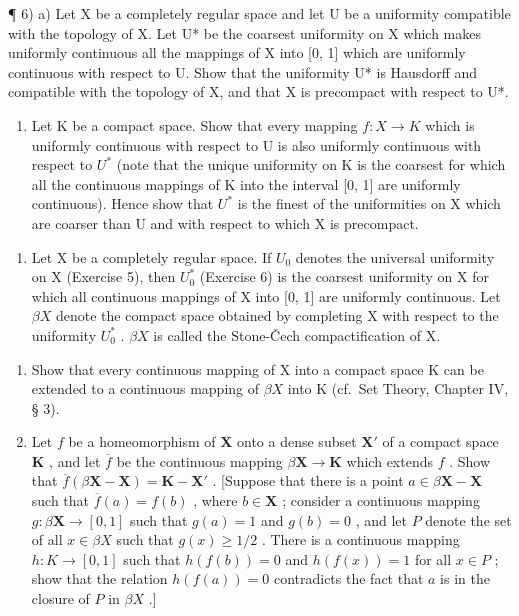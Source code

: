 ¶ 6) a) Let X be a completely regular space and let U be a uniformity compatible with the topology of X. Let U* be the coarsest uniformity on X which makes uniformly continuous all the mappings of X into {[}0, 1{]} which are uniformly continuous with respect to U. Show that the uniformity U* is Hausdorff and compatible with the topology of X, and that X is precompact with respect to U*.

\begin{enumerate}
\def\labelenumi{\alph{enumi})}
\setcounter{enumi}{1}
\tightlist
\item
  Let K be a compact space. Show that every mapping \(f: X \to K\) which is uniformly continuous with respect to U is also uniformly continuous with respect to \(U^{*}\) (note that the unique uniformity on K is the coarsest for which all the continuous mappings of K into the interval {[}0, 1{]} are uniformly continuous). Hence show that \(U^{*}\) is the finest of the uniformities on X which are coarser than U and with respect to which X is precompact.
\end{enumerate}

\begin{enumerate}
\def\labelenumi{\arabic{enumi})}
\setcounter{enumi}{6}
\tightlist
\item
  Let X be a completely regular space. If \(U_{0}\) denotes the universal uniformity on X (Exercise 5), then \(U_{0}^{*}\) (Exercise 6) is the coarsest uniformity on X for which all continuous mappings of X into {[}0, 1{]} are uniformly continuous. Let \(\beta X\) denote the compact space obtained by completing X with respect to the uniformity \(U_{0}^{*}\) . \(\beta X\) is called the Stone-Čech compactification of X.
\end{enumerate}

\begin{enumerate}
\def\labelenumi{\alph{enumi})}
\item
  Show that every continuous mapping of X into a compact space K can be extended to a continuous mapping of \(\beta X\) into K (cf.~Set Theory, Chapter IV, § 3).
\item
  Let \(f\) be a homeomorphism of \(\mathbf{X}\) onto a dense subset \(\mathbf{X}'\) of a compact space \(\mathbf{K}\) , and let \(\overline{f}\) be the continuous mapping \(\beta \mathbf{X} \to \mathbf{K}\) which extends \(f\) . Show that \(\overline{f}(\beta \mathbf{X} - \mathbf{X}) = \mathbf{K} - \mathbf{X}'\) . {[}Suppose that there is a point \(a \in \beta \mathbf{X} - \mathbf{X}\) such that \(\overline{f}(a) = f(b)\) , where \(b \in \mathbf{X}\) ; consider a continuous mapping \(g: \beta \mathbf{X} \to [0, 1]\) such that \(g(a) = 1\) and \(g(b) = 0\) , and let \(P\) denote the set of all \(x \in \beta X\) such that \(g(x) \geqslant 1/2\) . There is a continuous mapping \(h: K \to [0, 1]\) such that \(h(f(b)) = 0\) and \(h(f(x)) = 1\) for all \(x \in P\) ; show that the relation \(h(f(a)) = 0\) contradicts the fact that \(a\) is in the closure of \(P\) in \(\beta X\) .{]}
\end{enumerate}

